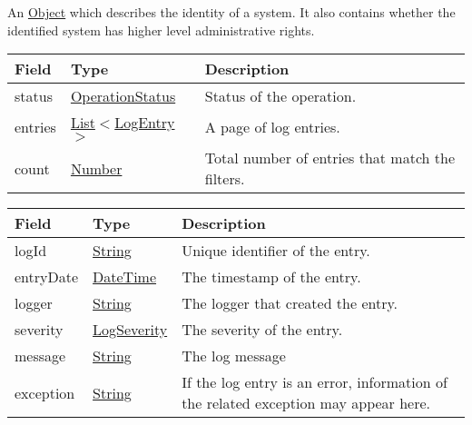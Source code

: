 \documentclass[a4paper]{arrowhead}
\newcommand{\pref}[1]{{\textcolor{ArrowheadGrey}{\hyperref[sec:model:primitives:#1]{#1}}}}
\begin{document}
\label{sec:model:Identity}

An \pref{Object} which describes the identity of a system. It also contains whether the identified system has higher level administrative rights.

\label{sec:model:LogResponse}

\begin{table}[ht!]
\begin{tabularx}{\textwidth}{| p{2.5cm} | p{2.5cm} | X |} \hline
\rowcolor{gray!33} Field & Type      & Description \\ \hline
status & \pref{OperationStatus} & Status of the operation. \\ \hline
entries & \pref{List}$<$\hyperref[sec:model:LogEntry]{LogEntry}$>$ & A page of log entries. \\ \hline
count & \pref{Number} & Total number of entries that match the filters. \\ \hline
\end{tabularx}
\end{table}

\clearpage

\label{sec:model:LogEntry}
 
\begin{table}[ht!]
\begin{tabularx}{\textwidth}{| p{2.5cm} | p{2.5cm} | X |} \hline
\rowcolor{gray!33} Field & Type      & Description \\ \hline
logId & \pref{String} & Unique identifier of the entry. \\ \hline
entryDate & \pref{DateTime} & The timestamp of the entry. \\ \hline
logger & \pref{String} & The logger that created the entry. \\ \hline
severity & \pref{LogSeverity} & The severity of the entry. \\ \hline
message & \pref{String} & The log message \\ \hline
exception & \pref{String} & If the log entry is an error, information of the related exception may appear here. \\ \hline
\end{tabularx}
\end{table}

\label{sec:model:ErrorResponse}
\end{document}
